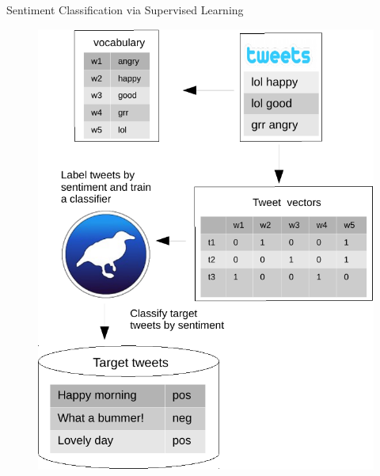 \documentclass[handout]{beamer}
\begin{document}
\begin{frame}{Sentiment Classification via Supervised Learning}

\begin{figure}[h]
        	\includegraphics[scale = 0.5]{pics/bagOfwordsClassification.pdf}
        \end{figure}

\end{frame}
\end{document}
